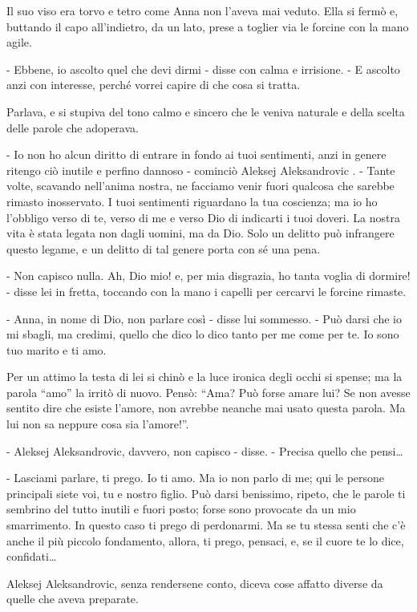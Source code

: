 Il suo viso era torvo e tetro come Anna non l'aveva mai veduto. Ella si fermò e, buttando il capo all'indietro, da un lato, prese a toglier via le forcine con la mano agile. 

- Ebbene, io ascolto quel che devi dirmi - disse con calma e irrisione. - E ascolto anzi con interesse, perché vorrei capire di che cosa si tratta. 

Parlava, e si stupiva del tono calmo e sincero che le veniva naturale e della scelta delle parole che adoperava. 

- Io non ho alcun diritto di entrare in fondo ai tuoi sentimenti, anzi in genere ritengo ciò inutile e perfino dannoso - cominciò Aleksej Aleksandrovic . - Tante volte, scavando nell'anima nostra, ne facciamo venir fuori qualcosa che sarebbe rimasto inosservato. I tuoi sentimenti riguardano la tua coscienza; ma io ho l'obbligo verso di te, verso di me e verso Dio di indicarti i tuoi doveri. La nostra vita è stata legata non dagli uomini, ma da Dio. Solo un delitto può infrangere questo legame, e un delitto di tal genere porta con sé una pena. 

- Non capisco nulla. Ah, Dio mio! e, per mia disgrazia, ho tanta voglia di dormire! - disse lei in fretta, toccando con la mano i capelli per cercarvi le forcine rimaste. 

- Anna, in nome di Dio, non parlare così - disse lui sommesso. - Può darsi che io mi sbagli, ma credimi, quello che dico lo dico tanto per me come per te. Io sono tuo marito e ti amo. 

Per un attimo la testa di lei si chinò e la luce ironica degli occhi si spense; ma la parola ``amo'' la irritò di nuovo. Pensò: ``Ama? Può forse amare lui? Se non avesse sentito dire che esiste l'amore, non avrebbe neanche mai usato questa parola. Ma lui non sa neppure cosa sia l'amore!''. 

- Aleksej Aleksandrovic, davvero, non capisco - disse. - Precisa quello che pensi\ldots{} 

- Lasciami parlare, ti prego. Io ti amo. Ma io non parlo di me; qui le persone principali siete voi, tu e nostro figlio. Può darsi benissimo, ripeto, che le parole ti sembrino del tutto inutili e fuori posto; forse sono provocate da un mio smarrimento. In questo caso ti prego di perdonarmi. Ma se tu stessa senti che c'è anche il più piccolo fondamento, allora, ti prego, pensaci, e, se il cuore te lo dice, confidati\ldots{} 

Aleksej Aleksandrovic, senza rendersene conto, diceva cose affatto diverse da quelle che aveva preparate. 


